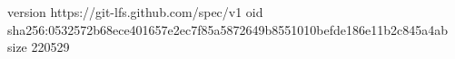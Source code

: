 version https://git-lfs.github.com/spec/v1
oid sha256:0532572b68ece401657e2ec7f85a5872649b8551010befde186e11b2c845a4ab
size 220529
